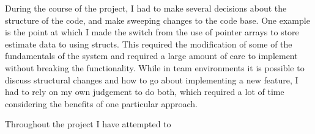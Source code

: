 \documentclass[a4paper,11pt]{article}
\begin{document}
   During the course of the project, I had to make several decisions about the
   structure of the code, and make sweeping changes to the code base. One
   example is the point at which I made the switch from the use of pointer
   arrays to store estimate data to using structs. This required the
   modification of some of the fundamentals of the system and required a large
   amount of care to implement without breaking the functionality. While in team
   environments it is possible to discuss structural changes and how to go about
   implementing a new feature, I had to rely on my own judgement to do both,
   which required a lot of time considering the benefits of one particular
   approach.

   Throughout the project I have attempted to 

\newpage
\printbibliography
\newpage
\end{document}
